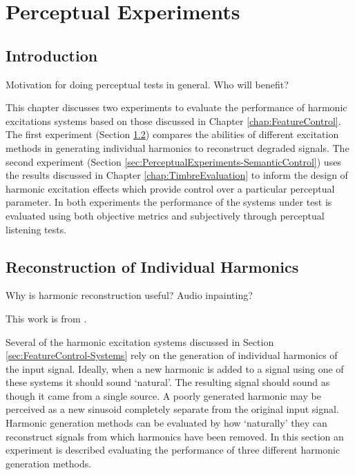 \chapter{Perceptual Experiments} %
\label{chap:PerceptualExperiments}

\section{Introduction}
\label{sec:PerceptualExperiments-Introduction}
	\note
	{
		Motivation for doing perceptual tests in general. Who will benefit?
	}

	This chapter discusses two experiments to evaluate the performance of harmonic excitations systems based on those
	discussed in Chapter \ref{chap:FeatureControl}. The first experiment (Section
	\ref{sec:PerceptualExperiments-Reconstruction}) compares the abilities of different excitation methods in
	generating individual harmonics to reconstruct degraded signals. The second experiment (Section
	\ref{sec:PerceptualExperiments-SemanticControl}) uses the results discussed in Chapter \ref{chap:TimbreEvaluation}
	to inform the design of harmonic excitation effects which provide control over a particular perceptual parameter.
	In both experiments the performance of the systems under test is evaluated using both objective metrics and
	subjectively through perceptual listening tests.

\section{Reconstruction of Individual Harmonics}
\label{sec:PerceptualExperiments-Reconstruction}
	\note
	{
		Why is harmonic reconstruction useful? Audio inpainting?
	}

	\note
	{
		This work is from \citet{enderby2013methods}.
	}

	Several of the harmonic excitation systems discussed in Section \ref{sec:FeatureControl-Systems} rely on the
	generation of individual harmonics of the input signal. Ideally, when a new harmonic is added to a signal using one
	of these systems it should sound `natural'. The resulting signal should sound as though it came from a single
	source. A poorly generated harmonic may be perceived as a new sinusoid completely separate from the original input
	signal. Harmonic generation methods can be evaluated by how `naturally' they can reconstruct signals from which
	harmonics have been removed. In this section an experiment is described evaluating the performance of three
	different harmonic generation methods.

